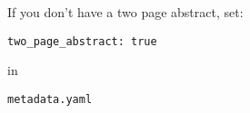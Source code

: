 If you don't have a two page abstract, set:

{\tt two\_page\_abstract: true}  

in

{\tt metadata.yaml}
